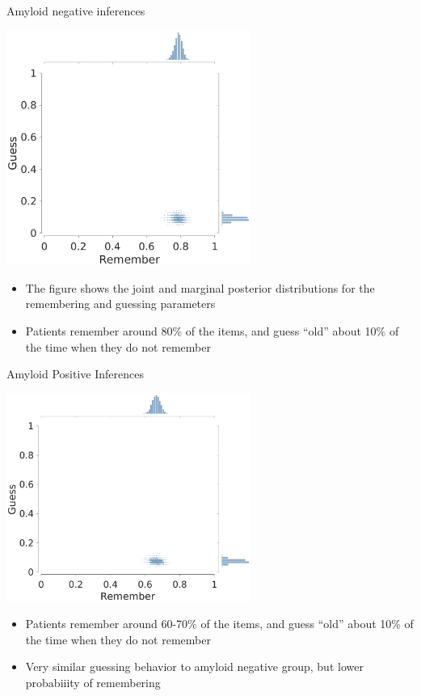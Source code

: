 \documentclass[10pt]{beamer}
\begin{document}
\begin{frame}[fragile]{Amyloid negative inferences}
	\begin{center}
		{\includegraphics[width = 0.6\textwidth, trim = {0cm 0 0cm 1.75cm}, clip]{oneHighThreshold_1_betaAmyloidNegative.eps}}
	\end{center}
	
	\begin{itemize}
		\item The figure shows the joint and marginal posterior distributions for the remembering and guessing parameters
		\item Patients remember around 80\% of the items, and guess ``old'' about 10\% of the time when they do not remember
	\end{itemize}
	
\end{frame}

\begin{frame}[fragile]{Amyloid Positive Inferences}
	\begin{center}
		\includegraphics[width = 0.6\textwidth, trim = {0cm 0 0cm 1.5cm}, clip]{oneHighThreshold_1_betaAmyloidPositive.eps}
	\end{center}
	\begin{itemize}
		\item Patients remember around 60-70\% of the items, and guess ``old'' about 10\% of the time when they do not remember
		\item Very similar guessing behavior to amyloid negative group, but lower probabiiity of remembering
	\end{itemize}
\end{frame}
\end{document}
